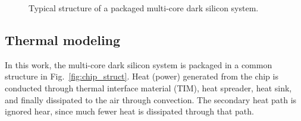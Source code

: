 
\begin{figure}
  \centering
\caption{Typical structure of a
    packaged multi-core dark silicon system.}
\end{figure}
\subsection{Thermal modeling}
In this work, the multi-core dark silicon system is packaged in a common structure in Fig.~\ref{fig:chip_struct}. 
Heat (power) generated from the chip is conducted through thermal interface material (TIM), heat spreader, heat sink, and finally dissipated to the air through convection. The secondary heat path is ignored hear, since much fewer heat is dissipated through that path.

